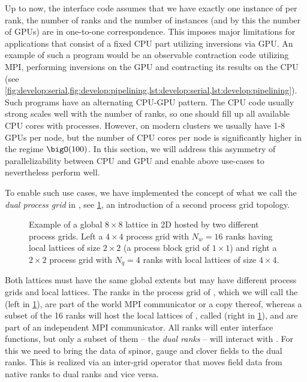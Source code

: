 
Up to now, the interface code assumes that we have exactly one instance of \quda per rank, \ie the number of ranks and the number of \quda instances (and by this the number of GPUs) are in one-to-one correspondence.
This imposes major limitations for applications that consist of a fixed CPU part utilizing inversions via GPU.
An example of such a program would be an observable contraction code utilizing MPI, performing inversions on the GPU and contracting its results on the CPU (see \cref{fig:develop:serial,fig:develop:pipelining,lst:develop:serial,lst:develop:pipelining}).
Such programs have an alternating CPU-GPU pattern.
The CPU code usually strong scales well with the number of ranks, so one should fill up all available CPU cores with processes.
However, on modern clusters we usually have 1-8 GPUs per node, but the number of CPU cores per node is significantly higher in the regime $\bigO(100)$.
In this section, we will address this asymmetry of parallelizability between CPU and GPU and enable above use-cases to nevertheless perform well.

To enable such use cases, we have implemented the concept of what we call the \emph{dual process grid} in \openqxd, see \cref{fig:interface:dual_naive}, \ie an introduction of a second process grid topology.
\begin{figure}
  
  \caption{Example of a global $8 \times 8$ lattice in 2D hosted by two different process grids. Left a $4 \times 4$ process grid with $N_w = 16$ ranks having local lattices of size $2 \times 2$ (a process block grid of $1 \times 1$) and right a $2 \times 2$ process grid with $N_q = 4$ ranks with local lattices of size $4 \times 4$.}
  \label{fig:interface:dual_naive}
\end{figure}
Both lattices must have the same global extents but may have different process grids and local lattices.
The ranks in the process grid of \openqxd, which we will call the  (left in \cref{fig:interface:dual_naive}), are part of the world MPI communicator  or a copy thereof, whereas a subset of the \num{16} ranks will host the local lattices of \quda, called  (right in \cref{fig:interface:dual_naive}), and are part of an independent MPI communicator.
All ranks will enter interface functions, but only a subset of them -- the \emph{dual ranks} -- will interact with \quda.
For this we need to bring the data of spinor, gauge and clover fields to the dual ranks.
This is realized via an inter-grid operator that moves field data from native ranks to dual ranks and vice versa.

